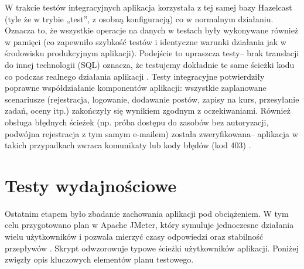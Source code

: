 W trakcie testów integracyjnych aplikacja korzystała z tej samej bazy
Hazelcast (tyle że w trybie „test”, z osobną konfiguracją) co w normalnym
działaniu. Oznacza to, że wszystkie
operacje na danych w testach były wykonywane również w pamięci (co
zapewniło szybkość testów i identyczne warunki działania jak w
środowisku produkcyjnym aplikacji). Podejście to upraszcza testy-- brak
translacji do innej technologii (SQL) oznacza, że testujemy dokładnie te
same ścieżki kodu co podczas realnego działania aplikacji \cite{hazelcast-docs}. Testy
integracyjne potwierdziły poprawne współdziałanie komponentów aplikacji:
wszystkie zaplanowane scenariusze (rejestracja, logowanie, dodawanie
postów, zapisy na kurs, przesyłanie zadań, oceny itp.) zakończyły się
wynikiem zgodnym z oczekiwaniami. Również obsługa błędnych ścieżek (np.
próba dostępu do zasobów bez autoryzacji, podwójna rejestracja z tym samym
e-mailem) została zweryfikowana-- aplikacja w takich przypadkach zwraca komunikaty lub kody błędów (kod 403) \cite{spring-docs}.

\section{Testy wydajnościowe}

Ostatnim etapem było zbadanie zachowania aplikacji pod obciążeniem. W tym celu przygotowano plan w Apache JMeter, który symuluje jednoczesne działania wielu użytkowników i pozwala mierzyć czasy odpowiedzi oraz stabilność przepływów \cite{jmeter-docs}. Skrypt odwzorowuje typowe ścieżki użytkowników aplikacji. Poniżej zwięzły opis kluczowych elementów planu testowego.

